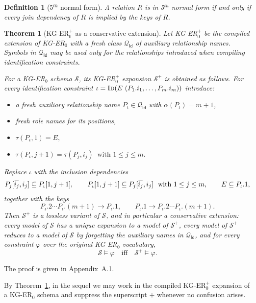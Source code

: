 \documentclass[10pt]{article}
\newtheorem{definition}{Definition}
\newtheorem{theorem}{Theorem}
\newcommand{\ols}[1]{\mskip.5\thinmuskip\overline{\mskip-.5\thinmuskip {#1} \mskip-.5\thinmuskip}\mskip.5\thinmuskip} %
\begin{document}
\begin{definition}[5$^{th}$ normal form]
A relation $R$ is in 5$^{th}$ normal form if and only if every join
dependency of $R$ is implied by the keys of $R$.
\end{definition}

\begin{theorem}[KG-ER\(_0^+\) as a conservative extension]
\label{thm:kger-definitional-extension}
Let KG-ER\(_0^+\) be the compiled extension of KG-ER\(_0\) with a fresh
class \(\mathcal Q_{\mathsf{Id}}\) of auxiliary relationship names.
Symbols in \(\mathcal Q_{\mathsf{Id}}\) may be used only for the
relationships introduced when compiling identification constraints.  

For a KG-ER\(_0\) schema \(\mathcal S\), its KG-ER\(_0^+\) expansion
\(\mathcal S^+\) is obtained as follows.  For every identification
constraint
\(
\iota=\textsc{Id}(E\ (P_1.i_1,\ldots,P_m.i_m))
\)
introduce:
\begin{itemize}
	\item a fresh auxiliary relationship name
\(P_\iota\in\mathcal Q_{\mathsf{Id}}\) with
\(\alpha(P_\iota)=m+1\),
	\item fresh role names for its positions,
	\item $\tau(P_\iota,1)=E,$
	\item $\tau(P_\iota,j+1)=\tau(P_j,i_j) ~\text{ with } 1\leq j\leq m.$
\end{itemize}

\noindent
Replace \(\iota\) with the inclusion dependencies
\[
P_j[\ols{i_j},i_j]\subseteq P_\iota[1,j+1],
\qquad
P_\iota[1,j+1]\subseteq P_j[\ols{i_j},i_j] ~\text{ with } 1\leq j\leq m,
\qquad
E\subseteq P_\iota.1,
\]
together with the keys
\[
P_\iota.2\cdots P_\iota.(m+1)\to P_\iota.1,\qquad
P_\iota.1\to P_\iota.2\cdots P_\iota.(m+1).
\]
Then \(\mathcal S^+\) is a lossless variant of \(\mathcal S\), and 
in particular a conservative extension: every model of \(\mathcal S\) has a
unique expansion to a model of \(\mathcal S^+\), every model of
\(\mathcal S^+\) reduces to a model of \(\mathcal S\) by forgetting the
auxiliary names in \(\mathcal Q_{\mathsf{Id}}\), and for every constraint
\(\varphi\) over the original KG-ER\(_0\) vocabulary,
\[
\mathcal S\models\varphi
\quad\text{iff}\quad
\mathcal S^+\models\varphi .
\]
\end{theorem}

The proof is given in Appendix~A.1.


By Theorem~\ref{thm:kger-definitional-extension}, in the sequel we may work
in the compiled KG-ER\(_0^+\) expansion of a KG-ER\(_0\) schema and
suppress the superscript \(+\) whenever no confusion arises.
\end{document}
